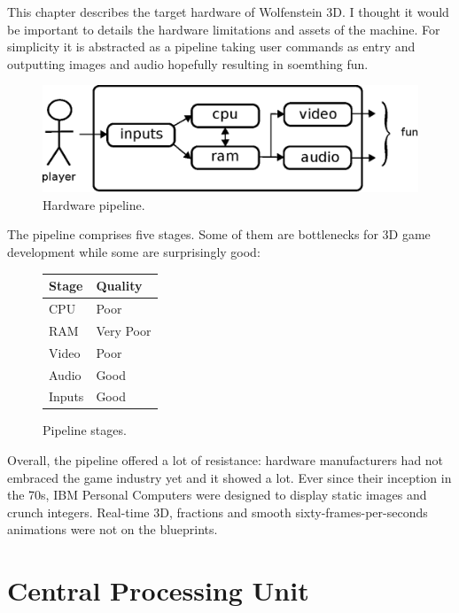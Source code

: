\documentclass[book.tex]{subfiles}
\begin{document}
This chapter describes the target hardware of Wolfenstein 3D. I thought it would be important to details the hardware limitations and assets of the machine. For simplicity it is abstracted as a pipeline taking user commands as entry and outputting images and audio hopefully resulting in soemthing fun.

\begin{figure}[H]
\centering
\includegraphics[scale=1]{imgs/fun_pipeline.eps}
%
\caption{Hardware pipeline.}
\label{fig:digraph}
\end{figure}

The pipeline comprises five stages. Some of them are bottlenecks for 3D game development while some are surprisingly good:

 \bigskip

\begin{figure}[H]
\centering
\begin{tabularx}{\textwidth}{ X X  }
  \toprule
  \textbf{Stage} & \textbf{Quality} \\ \bottomrule
  CPU & Poor \\ 
  RAM & Very Poor \\ 
  Video & Poor \\ 
  Audio & Good \\ 
  Inputs & Good \\ \bottomrule
\end{tabularx}
\caption{Pipeline stages.}  \label{fig:Pipeline stages}
\end{figure}

Overall, the pipeline offered a lot of resistance: hardware manufacturers had not embraced the game industry yet and it showed a lot. Ever since their inception in the 70s, IBM Personal Computers were designed to display static images and crunch integers. Real-time 3D, fractions and smooth sixty-frames-per-seconds animations were not on the blueprints.

\section{Central Processing Unit}
\end{document}
